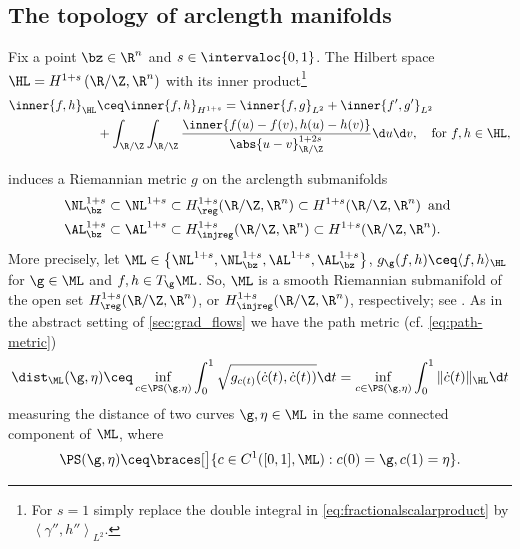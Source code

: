 \subsection{The topology of arclength manifolds}
\label{sec:AL-toplogy}
Fix a point $\bz\in\R^n$ and $s\in \intervaloc{0,1}$. The Hilbert space $ \HL=H^{1+s}\left( \R/\Z,\R^n \right) $ with its inner product\footnote{For $ s=1 $ simply replace the double integral in \cref{eq:fractionalscalarproduct} by $ \left\langle \gamma'',h'' \right\rangle_{L^2}  $.}
\begin{equation}\label{eq:fractionalscalarproduct}
\begin{aligned}
	\inner{f,h}_\HL&\ceq\inner{f,h}_{H^{1+s}}=\inner{f,g}_{L^2}+\inner{f',g'}_{L^2}\\
	&+\int_{\R/\Z}\int_{\R/\Z}\frac{\inner{f(u)-f(v),h(u)-h(v)}}{
	\abs{u-v}_{\R/\Z}^{1+2s}}\d u \d v,\quad 
	\text{for $f,h \in \HL$},
\end{aligned}
\end{equation}

induces a Riemannian metric $g$ on  the arclength submanifolds
\begin{align*}
	&\NL^{1+s}_\bz\subset\NL^{1+s}\subset H^{1+s}_\reg(\R/\Z,\R^n)\subset
H^{1+s}(\R/\Z,\R^n)\,\text{ and }\\
&\AL^{1+s}_\bz\subset\AL^{1+s}\subset H^{1+s}_\injreg(\R/\Z,\R^n)\subset
H^{1+s}(\R/\Z,\R^n).
\end{align*}
More precisely, let $ \ML\in \left\{\NL^{1+s},\NL^{1+s}_{\bz},\AL^{1+s},\AL^{1+s}_{\bz}\right\} $,
$g_\g(f,h)\ceq\langle f,h\rangle_\HL$
for $\g\in\ML$ and $f,h\in T_\g\ML$. So, $\ML$ is a
smooth Riemannian submanifold of the open set $H^{1+s}_\reg(\R/\Z,\R^n) $, or $H^{1+s}_\injreg(\R/\Z,\R^n)$,
respectively; see
\cite[Theorem 3.6]{palais_1966}.
As in the abstract setting of \cref{sec:grad_flows} we have
the path metric (cf.{} \cref{eq:path-metric})
\begin{equation}\label{eq:path-metricALsz}
\dist_{\ML}(\g,\eta)\ceq\inf_{c\in \PS(\g,\eta)}\int_0^1 
\sqrt{g_{c(t)}(\dot{c}(t),\dot{c}(t))}\d t=
\inf_{c\in \PS(\g,\eta)}\int_0^1 \|\dot{c}(t)\|_\HL \d t 
\end{equation}
measuring the distance of
two curves $\g,\eta\in\ML$
in the same connected component of $\ML$, where 
\begin{equation}\label{eq:path-spaceAL}
	\PS(\g,\eta)
	\ceq
	\braces[\big]{
		c\in C^1([0,1],\ML)
		:
		c(0)=\g,c(1)=\eta
	}.
\end{equation}

